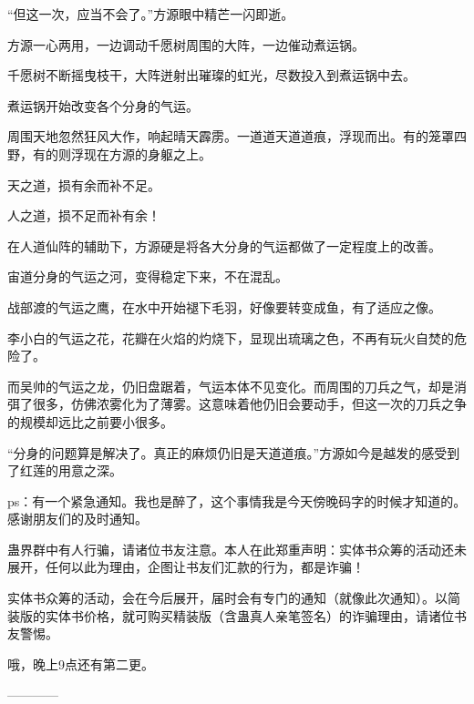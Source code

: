 \begin{this_body}
“但这一次，应当不会了。”方源眼中精芒一闪即逝。

方源一心两用，一边调动千愿树周围的大阵，一边催动煮运锅。

千愿树不断摇曳枝干，大阵迸射出璀璨的虹光，尽数投入到煮运锅中去。

煮运锅开始改变各个分身的气运。

周围天地忽然狂风大作，响起晴天霹雳。一道道天道道痕，浮现而出。有的笼罩四野，有的则浮现在方源的身躯之上。

天之道，损有余而补不足。

人之道，损不足而补有余！

在人道仙阵的辅助下，方源硬是将各大分身的气运都做了一定程度上的改善。

宙道分身的气运之河，变得稳定下来，不在混乱。

战部渡的气运之鹰，在水中开始褪下毛羽，好像要转变成鱼，有了适应之像。

李小白的气运之花，花瓣在火焰的灼烧下，显现出琉璃之色，不再有玩火自焚的危险了。

而吴帅的气运之龙，仍旧盘踞着，气运本体不见变化。而周围的刀兵之气，却是消弭了很多，仿佛浓雾化为了薄雾。这意味着他仍旧会要动手，但这一次的刀兵之争的规模却远比之前要小很多。

“分身的问题算是解决了。真正的麻烦仍旧是天道道痕。”方源如今是越发的感受到了红莲的用意之深。

ps：有一个紧急通知。我也是醉了，这个事情我是今天傍晚码字的时候才知道的。感谢朋友们的及时通知。

蛊界群中有人行骗，请诸位书友注意。本人在此郑重声明：实体书众筹的活动还未展开，任何以此为理由，企图让书友们汇款的行为，都是诈骗！

实体书众筹的活动，会在今后展开，届时会有专门的通知（就像此次通知）。以简装版的实体书价格，就可购买精装版（含蛊真人亲笔签名）的诈骗理由，请诸位书友警惕。

哦，晚上9点还有第二更。

------------

\end{this_body}

